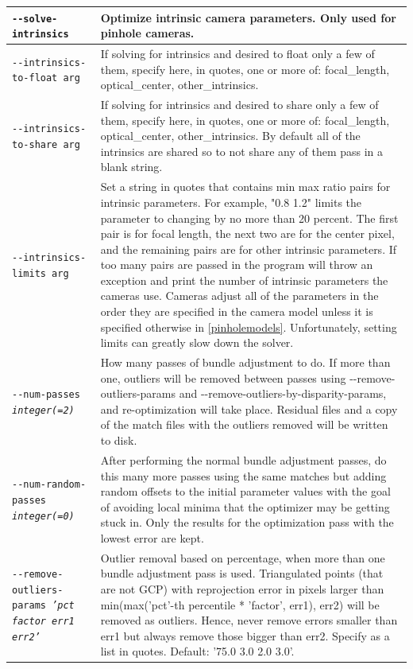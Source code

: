 \begin{longtable}{|p{8cm}|p{9cm}|}
\texttt{-\/-solve-intrinsics} & Optimize intrinsic camera parameters. Only used for pinhole cameras.\\ \hline

\texttt{-\/-intrinsics-to-float arg} & If solving for intrinsics and desired to float only a few of them, specify here, in quotes, one or more of: focal\_length, optical\_center, other\_intrinsics.\\ \hline

\texttt{-\/-intrinsics-to-share arg} & If solving for intrinsics and desired to share only a few of them, specify here, in quotes, one or more of: focal\_length, optical\_center, other\_intrinsics.  By default all of the intrinsics are shared so to not share any of them pass in a blank string.\\ \hline

\texttt{-\/-intrinsics-limits arg} & Set a string in quotes that contains min max ratio pairs for intrinsic parameters.  For example, "0.8 1.2" limits the parameter to changing by no more than 20 percent.  The first pair is for focal length, the next two are for the center pixel, and the remaining pairs are for other intrinsic parameters.  If too many pairs are passed in the program will throw an exception and print the number of intrinsic parameters the cameras use.  Cameras adjust all of the parameters in the order they are specified in the camera model unless it is specified otherwise in \ref{pinholemodels}. Unfortunately, setting limits can greatly slow down the solver.\\ \hline

\texttt{-\/-num-passes \textit{integer(=2)}} &
How many passes of bundle adjustment to do. If more than one, outliers will be removed between passes using -\/-remove-outliers-params and -\/-remove-outliers-by-disparity-params, and re-optimization will take place. Residual files and a copy of the match files with the outliers removed will be written to disk.\\ \hline

\texttt{-\/-num-random-passes \textit{integer(=0)}} &
After performing the normal bundle adjustment passes, do this many more passes using the same matches but adding random offsets to the initial parameter values with the goal of avoiding local minima that the optimizer may be getting stuck in.  Only the results for the optimization pass with the lowest error are kept.\\ \hline

\texttt{-\/-remove-outliers-params \textit{'pct factor err1 err2'}} &
Outlier removal based on percentage, when more than one bundle adjustment pass is used. Triangulated points (that are not GCP) with reprojection error in pixels larger than min(max('pct'-th percentile * 'factor', err1), err2) will be removed as outliers. Hence, never remove errors smaller than err1 but always remove those bigger than err2. Specify as a list in quotes. Default: '75.0 3.0 2.0 3.0'.\\ \hline


\end{longtable}
